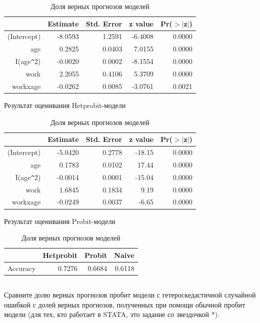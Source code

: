 \documentclass[a4paper,12pt]{article}
\begin{document}
\begin{table}[ht]
	\centering
	\begin{tabular}{|rrrrr|}
		\hline
		& Estimate & Std. Error & z value & Pr($>$$|$z$|$) \\ 
		\hline
		(Intercept) & -8.0593 & 1.2591 & -6.4008 & 0.0000 \\ 
		age & 0.2825 & 0.0403 & 7.0155 & 0.0000 \\ 
		I(age\verb|^|2) & -0.0020 & 0.0002 & -8.1554 & 0.0000 \\ 
		work & 2.2055 & 0.4106 & 5.3709 & 0.0000 \\ 
		workxage & -0.0262 & 0.0085 & -3.0761 & 0.0021 \\ 
		\hline
	\end{tabular}

\caption{Результат оценивания Hetprobit-модели}

 \vspace{2em}
	\centering
	\begin{tabular}{|rrrrr|}
		\hline
		& Estimate & Std. Error & z value & Pr($>$$|$z$|$) \\ 
		\hline
		(Intercept) & -5.0420 & 0.2778 & -18.15 & 0.0000 \\ 
		age & 0.1783 & 0.0102 & 17.44 & 0.0000 \\ 
		I(age\verb|^|2) & -0.0014 & 0.0001 & -15.04 & 0.0000 \\ 
		work & 1.6845 & 0.1834 & 9.19 & 0.0000 \\ 
		workxage & -0.0249 & 0.0037 & -6.65 & 0.0000 \\ 
		\hline
	\end{tabular}
\caption{Результат оценивания Probit-модели}

 \vspace{2em}
 
	\centering
	\begin{tabular}{|rrrr|}
		\hline
		& Hetprobit & Probit & Naive \\ 
		\hline
		Accuracy & 0.7276 & 0.6684 & 0.6118 \\ 
		\hline
	\end{tabular}
\caption{Доля верных прогнозов моделей}
\end{table}

\subsection{}
\Sun Сравните долю верных прогнозов пробит модели с гетероскедастичной
случайной ошибкой с долей верных прогнозов, полученных при помощи обычной пробит
модели (для тех, кто работает в STATA, это задание со звездочкой *).
\end{document}
